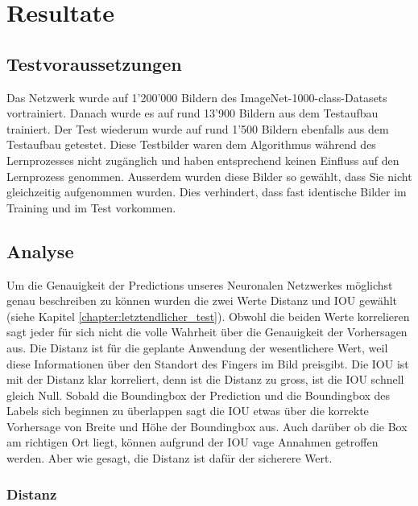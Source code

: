 \newpage
\section{Resultate}
\label{chapter:resultate}
\subsection{Testvoraussetzungen}
Das Netzwerk wurde auf 1'200'000 Bildern des ImageNet-1000-class-Datasets vortrainiert.
Danach wurde es auf rund 13'900 Bildern aus dem Testaufbau \cite{TabeasFingertracking} trainiert. 
Der Test wiederum wurde auf rund 1'500 Bildern ebenfalls aus dem Testaufbau \cite{TabeasFingertracking} getestet. 
Diese Testbilder waren dem Algorithmus während des Lernprozesses nicht zugänglich und haben entsprechend keinen Einfluss auf den Lernprozess genommen. 
Ausserdem wurden diese Bilder so gewählt, dass Sie nicht gleichzeitig aufgenommen wurden. 
Dies verhindert, dass fast identische Bilder im Training und im Test vorkommen. 

\subsection{Analyse}
Um die Genauigkeit der Predictions unseres Neuronalen Netzwerkes möglichst genau beschreiben zu können wurden die zwei Werte Distanz und IOU gewählt (siehe Kapitel \ref{chapter:letztendlicher_test}). 
Obwohl die beiden Werte korrelieren sagt jeder für sich nicht die volle Wahrheit über die Genauigkeit der Vorhersagen aus. 
Die Distanz ist für die geplante Anwendung der wesentlichere Wert, weil diese Informationen über den Standort des Fingers im Bild preisgibt.
Die IOU ist mit der Distanz klar korreliert, denn ist die Distanz zu gross, ist die IOU schnell gleich Null. 
Sobald die Boundingbox der Prediction und die Boundingbox des Labels sich beginnen zu überlappen sagt die IOU etwas über die korrekte Vorhersage von Breite und Höhe der Boundingbox aus. Auch darüber ob die Box am richtigen Ort liegt, können aufgrund der IOU vage Annahmen getroffen werden. Aber wie gesagt, die Distanz ist dafür der sicherere Wert. 

\subsubsection{Distanz}

